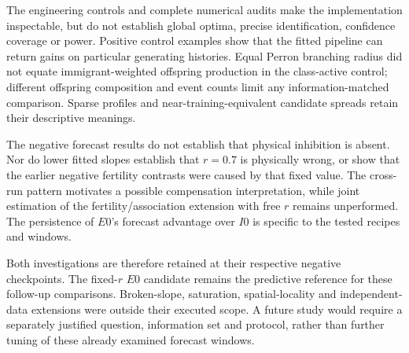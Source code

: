 The engineering controls and complete numerical audits make the
implementation inspectable, but do not establish global optima, precise
identification, confidence coverage or power. Positive control examples
show that the fitted pipeline can return gains on particular generating
histories. Equal Perron branching radius did not equate immigrant-weighted
offspring production in the class-active control; different offspring
composition and event counts limit any information-matched comparison.
Sparse profiles and near-training-equivalent candidate spreads retain
their descriptive meanings.

The negative forecast results do not establish that physical inhibition
is absent. Nor do lower fitted slopes establish that \(r=0.7\) is
physically wrong, or show that the earlier negative fertility contrasts
were caused by that fixed value. The cross-run pattern motivates a
possible compensation interpretation, while joint estimation of the
fertility/association extension with free \(r\) remains unperformed.
The persistence of \(E0\)'s forecast advantage over \(I0\) is specific
to the tested recipes and windows.

Both investigations are therefore retained at their respective negative
checkpoints. The fixed-\(r\) \(E0\) candidate remains the predictive
reference for these follow-up comparisons. Broken-slope, saturation,
spatial-locality and independent-data extensions were outside their
executed scope. A future study would require a separately justified
question, information set and protocol, rather than further tuning of
these already examined forecast windows.
